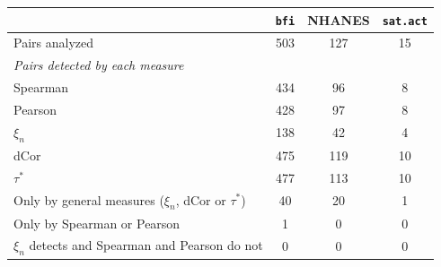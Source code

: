 \begin{tabular}{lccc}
\toprule
 & \texttt{bfi} & NHANES & \texttt{sat.act} \\
\midrule
Pairs analyzed & 503 & 127 & 15 \\
\midrule
\multicolumn{4}{l}{\emph{Pairs detected by each measure}} \\
Spearman & 434 & 96 & 8 \\
Pearson & 428 & 97 & 8 \\
$\xi_n$ & 138 & 42 & 4 \\
dCor & 475 & 119 & 10 \\
$\tau^*$ & 477 & 113 & 10 \\
\midrule
Only by general measures ($\xi_n$, dCor or $\tau^*$) & 40 & 20 & 1 \\
Only by Spearman or Pearson & 1 & 0 & 0 \\
$\xi_n$ detects and Spearman and Pearson do not & 0 & 0 & 0 \\
\bottomrule
\end{tabular}
